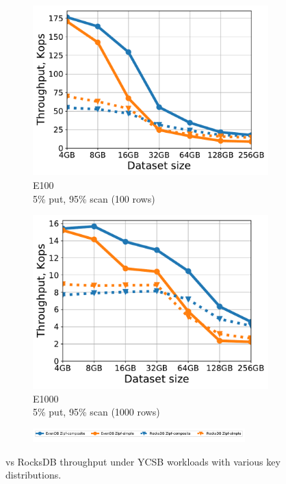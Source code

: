 \begin{figure}[tb]
\begin{subfigure}{0.32\linewidth}
\includegraphics[width=\textwidth]{figs/Workload_E_line.pdf}
\caption{E100 \\ 5\% put, 95\% scan (100 rows)}
\label{fig:throughput:e100}
\end{subfigure}
\begin{subfigure}{0.32\linewidth}
\includegraphics[width=\textwidth]{figs/Workload_E+_line.pdf}
\caption{E1000 \\5\% put, 95\% scan (1000 rows)}
\label{fig:throughput:e1000}
\end{subfigure}
\begin{subfigure}{\linewidth}
\centerline{
\includegraphics[width=0.9\textwidth]{figs/legend.pdf}
\vspace{-5mm}
}
\end{subfigure}
\caption{
{\sys\/ vs RocksDB throughput under YCSB workloads with various key distributions.}
}
\label{fig:throughput}
\end{figure}

